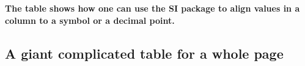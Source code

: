 \textbf{The table shows how one can use the SI package to align values in a column to a symbol or a decimal point. }



\subsection{A giant complicated table for a whole page}

\lipsum[61]


\begingroup
\renewcommand*{\arraystretch}{1.4}

\begin{sidewaystable}[]
	\centering
	\caption{Summary of the used annealing methods describing their characteristics in the context of oxide reduction experiments.}
	\label{annealing-summary}
\end{sidewaystable}
